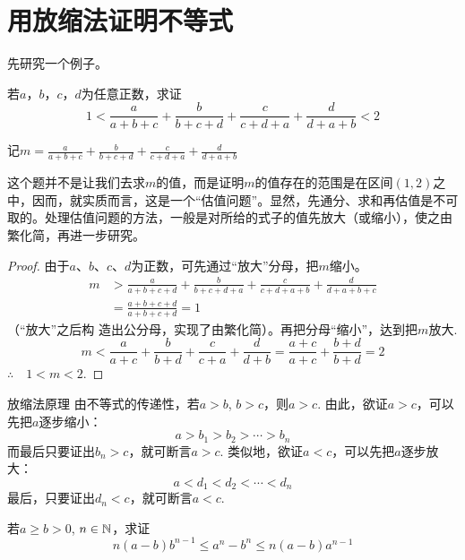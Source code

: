 \section{用放缩法证明不等式}

先研究一个例子。

\begin{example}
    若$a$，$b$，$c$，$d$为任意正数，求证
\[1<\frac{a}{a+b+c}+\frac{b}{b+c+d}+\frac{c}{c+d+a}+\frac{d}{d+a+b}<2\]
\end{example}

\begin{analyze}
    记$m=\frac{a}{a+b+c}+\frac{b}{b+c+d}+\frac{c}{c+d+a}+\frac{d}{d+a+b}$

这个题并不是让我们去求$m$的值，而是证明$m$的值存在的范围是在区间$(1,2)$之中，因而，就实质而言，这是一个“估值问题”。显然，先通分、求和再估值是不可取的。处理估值问题的方法，一般是对所给的式子的值先放大（或缩小），使之由繁化简，再进一步研究。
\end{analyze}

\begin{proof}
    由于$a$、$b$、$c$、$d$为正数，可先通过“放大”分母，把$m$缩小。
\[\begin{split}
    m&>\frac{a}{a+b+c+d}+\frac{b}{b+c+d+a}+\frac{c}{c+d+a+b}+\frac{d}{d+a+b+c}\\
    &=\frac{a+b+c+d}{a+b+c+d}=1
\end{split}\]
（“放大”之后构
造出公分母，实现了由繁化简）。再把分母“缩小”，达到把$m$放大.
\[m<\frac{a}{a+c}+\frac{b}{b+d}+\frac{c}{c+a}+\frac{d}{d+b}=\frac{a+c}{a+c}+\frac{b+d}{b+d}=2\]
$\therefore\quad 1<m<2$.
\end{proof}

\begin{thm}{放缩法原理}
由不等式的传递性，若$a>b$, $b>c$，则$a>c$. 由此，欲证$a>c$，可以先把$a$逐步缩小：
\[a>b_1>b_2>\cdots >b_n\]
而最后只要证出$b_n>c$，就可断言$a>c$. 类似地，欲证$a<c$，可以先把$a$逐步放大：
\[a<d_1<d_2<\cdots <d_n\]
最后，只要证出$d_n<c$，就可断言$a<c$.
\end{thm}

\begin{example}
    若$a\ge b>0$, $n\in\mathbb{N}$，求证
\begin{equation}
    n(a-b)b^{n-1}\le a^n-b^n\le n(a-b)a^{n-1}\tag{1}
\end{equation} 
\end{example}

